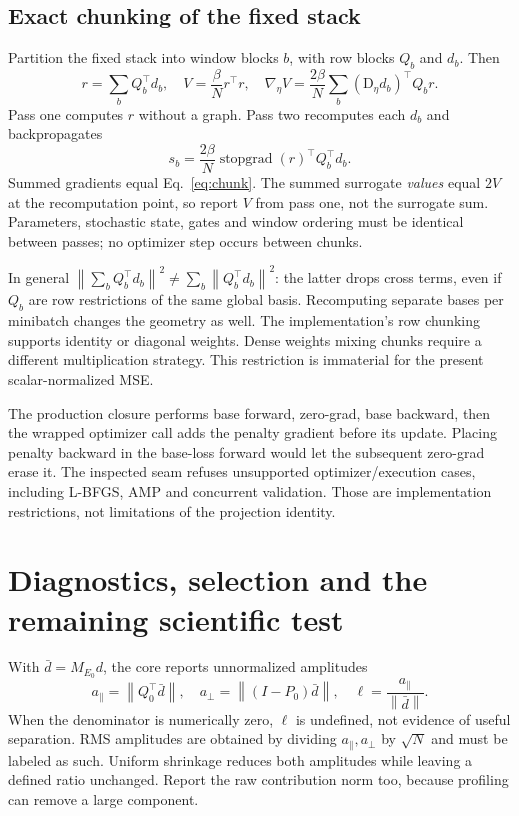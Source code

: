 \documentclass[11pt,a4paper]{article}
\newcommand{\D}{\mathrm D}
\newcommand{\norm}[1]{\left\lVert#1\right\rVert}
\newcommand{\stopgrad}{\operatorname{stopgrad}}
\theoremstyle{remark}
\begin{document}
\subsection{Exact chunking of the fixed stack}\label{sec:chunk}
Partition the fixed stack into window blocks $b$, with row blocks $Q_b$ and $d_b$. Then
\begin{equation}\label{eq:chunk}
 r=\sum_bQ_b^\top d_b,\quad V=\frac{\beta}{N}r^\top r,\quad
 \nabla_\eta V=\frac{2\beta}{N}\sum_b(\D_\eta d_b)^\top Q_b r.
\end{equation}
Pass one computes $r$ without a graph. Pass two recomputes each $d_b$ and backpropagates
\begin{equation}\label{eq:surrogate}
 s_b=\frac{2\beta}{N}\stopgrad(r)^\top Q_b^\top d_b.
\end{equation}
Summed gradients equal Eq.~\eqref{eq:chunk}. The summed surrogate \emph{values} equal $2V$ at the recomputation point, so report $V$ from pass one, not the surrogate sum. Parameters, stochastic state, gates and window ordering must be identical between passes; no optimizer step occurs between chunks.

In general $\norm{\sum_bQ_b^\top d_b}^2\ne\sum_b\norm{Q_b^\top d_b}^2$: the latter drops cross terms, even if $Q_b$ are row restrictions of the same global basis. Recomputing separate bases per minibatch changes the geometry as well. The implementation's row chunking supports identity or diagonal weights. Dense weights mixing chunks require a different multiplication strategy. This restriction is immaterial for the present scalar-normalized MSE.

The production closure performs base forward, zero-grad, base backward, then the wrapped optimizer call adds the penalty gradient before its update. Placing penalty backward in the base-loss forward would let the subsequent zero-grad erase it. The inspected seam refuses unsupported optimizer/execution cases, including L-BFGS, AMP and concurrent validation. Those are implementation restrictions, not limitations of the projection identity.

\section{Diagnostics, selection and the remaining scientific test}\label{sec:diagnostics}
With $\bar d=M_{E_0}d$, the core reports unnormalized amplitudes
\begin{equation}\label{eq:metrics}
 a_\parallel=\norm{Q_0^\top\bar d},\quad
 a_\perp=\norm{(I-P_0)\bar d},\quad
 \ell=\frac{a_\parallel}{\norm{\bar d}}.
\end{equation}
When the denominator is numerically zero, $\ell$ is undefined, not evidence of useful separation. RMS amplitudes are obtained by dividing $a_\parallel,a_\perp$ by $\sqrt N$ and must be labeled as such. Uniform shrinkage reduces both amplitudes while leaving a defined ratio unchanged. Report the raw contribution norm too, because profiling can remove a large component.
\end{document}
